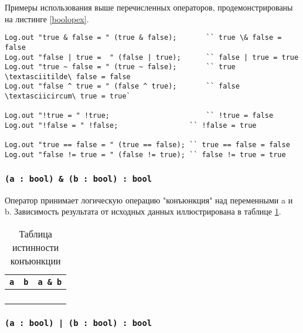 Примеры использования выше перечисленных операторов, продемонстрированы на листинге \ref{boolopex}.

\begin{sourcecode}
\label{boolopex}
\begin{verbatim}
Log.out "true & false = " (true & false);		`` true \& false = false
Log.out "false | true =  " (false | true);		`` false | true = true
Log.out "true ~ false = " (true ~ false);		`` true \textasciitilde\ false = false
Log.out "false ^ true = " (false ^ true);		`` false \textasciicircum\ true = true`

Log.out "!true = " !true;						`` !true = false
Log.out "!false = " !false;					`` !false = true

Log.out "true == false = " (true == false);	`` true == false = false
Log.out "false != true = " (false != true);	`` false != true = true
\end{verbatim}
\end{sourcecode}

\subsubsection{\texttt{(a : bool) & (b : bool) : bool}}

Оператор принимает логическую операцию "конъюнкция" над переменными a и b. Зависимость результата от исходных данных иллюстрирована в таблице \ref{conjtable}.

\begin{table}[htb]
	\caption{Таблица истинности конъюнкции}
	\label{conjtable}
	\begin{tabular}{|c|c|c|}
		\hline
		\texttt{a} & \texttt{b} & \texttt{a \& b} \\ \hline
		\false{} & \false{} & \false{}  	\\ \hline
		\false{} & \true{}  & \false{}  	\\ \hline
		\true{}  & \false{} & \false{}  	\\ \hline
		\true{}  & \true{}  & \true{}   	\\ \hline
	\end{tabular}
	\vspace{-2em}
\end{table}

\subsubsection{\texttt{(a : bool) | (b : bool) : bool}}

